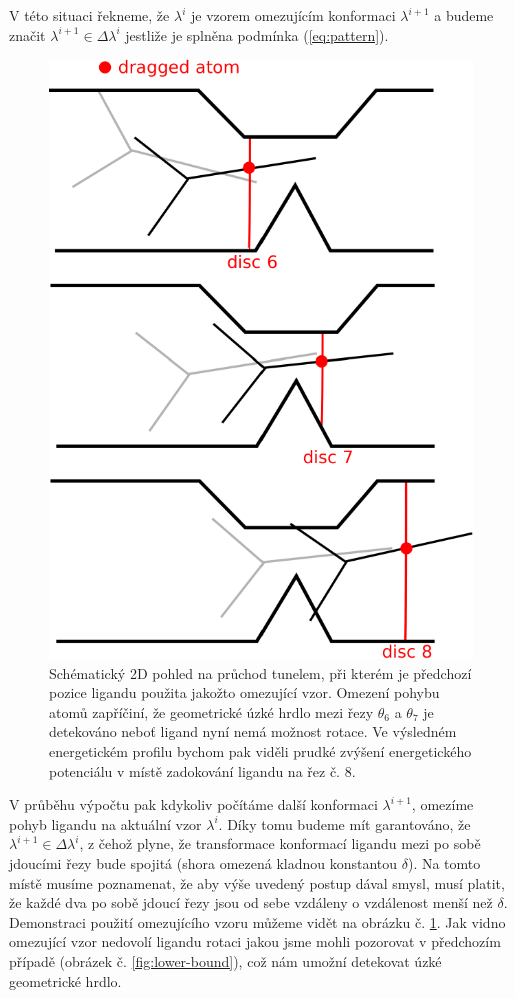 \begin{defi} \label{def:strong_pattern}
V této situaci řekneme, že $ \lambda^i $ je vzorem omezujícím konformaci
$ \lambda^{i+1} $ a budeme značit $ \lambda^{i+1} \in \Delta \lambda^i $ jestliže
je splněna podmínka (\ref{eq:pattern}).
\end{defi}


\begin{figure}[t]
\centering
\includegraphics[width=.5\hsize]{img/tun-2.pdf}
\caption{Schématický 2D pohled na průchod tunelem, při kterém je předchozí pozice
ligandu použita jakožto omezující vzor. Omezení pohybu atomů zapříčiní, že geometrické
úzké hrdlo mezi řezy $\theta_6$ a $\theta_7$ je detekováno neboť ligand nyní
nemá možnost rotace. Ve výsledném energetickém profilu bychom pak viděli prudké
zvýšení energetického potenciálu v místě zadokování ligandu na řez č. 8.}
\label{fig:continuous_transition}
\end{figure}

V průběhu výpočtu pak kdykoliv počítáme další konformaci $ \lambda^{i+1} $,
omezíme pohyb ligandu na aktuální vzor $ \lambda^{i} $. Díky tomu budeme mít
garantováno, že $ \lambda^{i+1} \in \Delta \lambda^i $, z čehož plyne, že
transformace konformací ligandu mezi po sobě jdoucími řezy bude spojitá
(shora omezená kladnou konstantou $ \delta $). Na tomto místě musíme poznamenat, že aby
výše uvedený postup dával smysl, musí platit, že každé dva po sobě jdoucí řezy jsou
od sebe vzdáleny o vzdálenost menší než $ \delta $. Demonstraci použití
omezujícího vzoru můžeme vidět na obrázku č. \ref{fig:continuous_transition}. Jak
vidno omezující vzor nedovolí ligandu rotaci jakou jsme mohli pozorovat
v předchozím případě (obrázek č. \ref{fig:lower-bound}), což nám umožní detekovat
úzké geometrické hrdlo.





